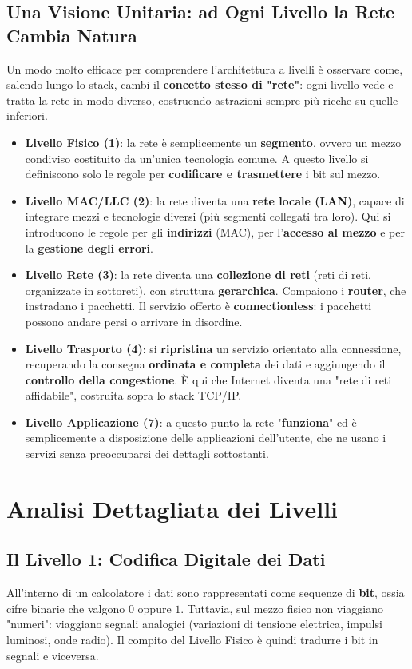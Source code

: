 \section{Una Visione Unitaria: ad Ogni Livello la Rete Cambia Natura}
Un modo molto efficace per comprendere l'architettura a livelli è osservare come, salendo lungo lo stack, cambi il \textbf{concetto stesso di "rete"}: ogni livello vede e tratta la rete in modo diverso, costruendo astrazioni sempre più ricche su quelle inferiori.
\begin{itemize}
    \item \textbf{Livello Fisico (1)}: la rete è semplicemente un \textbf{segmento}, ovvero un mezzo condiviso costituito da un'unica tecnologia comune. A questo livello si definiscono solo le regole per \textbf{codificare e trasmettere} i bit sul mezzo.
    \item \textbf{Livello MAC/LLC (2)}: la rete diventa una \textbf{rete locale (LAN)}, capace di integrare mezzi e tecnologie diversi (più segmenti collegati tra loro). Qui si introducono le regole per gli \textbf{indirizzi} (MAC), per l'\textbf{accesso al mezzo} e per la \textbf{gestione degli errori}.
    \item \textbf{Livello Rete (3)}: la rete diventa una \textbf{collezione di reti} (reti di reti, organizzate in sottoreti), con struttura \textbf{gerarchica}. Compaiono i \textbf{router}, che instradano i pacchetti. Il servizio offerto è \textbf{connectionless}: i pacchetti possono andare persi o arrivare in disordine.
    \item \textbf{Livello Trasporto (4)}: si \textbf{ripristina} un servizio orientato alla connessione, recuperando la consegna \textbf{ordinata e completa} dei dati e aggiungendo il \textbf{controllo della congestione}. È qui che Internet diventa una "rete di reti affidabile", costruita sopra lo stack TCP/IP.
    \item \textbf{Livello Applicazione (7)}: a questo punto la rete "\textbf{funziona}" ed è semplicemente a disposizione delle applicazioni dell'utente, che ne usano i servizi senza preoccuparsi dei dettagli sottostanti.
\end{itemize}

\chapter{Analisi Dettagliata dei Livelli}

\section{Il Livello 1: Codifica Digitale dei Dati}
All'interno di un calcolatore i dati sono rappresentati come sequenze di \textbf{bit}, ossia cifre binarie che valgono $0$ oppure $1$. Tuttavia, sul mezzo fisico non viaggiano "numeri": viaggiano segnali analogici (variazioni di tensione elettrica, impulsi luminosi, onde radio). Il compito del Livello Fisico è quindi tradurre i bit in segnali e viceversa.

